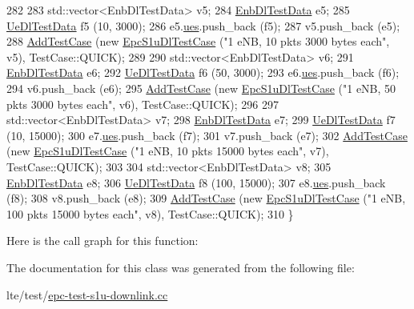 \begin{DoxyCode}
282 
283   std::vector<EnbDlTestData> v5;  
284   \hyperlink{structEnbDlTestData}{EnbDlTestData} e5;
285   \hyperlink{structUeDlTestData}{UeDlTestData} f5 (10, 3000);
286   e5.\hyperlink{structEnbDlTestData_a919da2f180c68423fc47ba8e1b088b13}{ues}.push\_back (f5);
287   v5.push\_back (e5);
288   \hyperlink{classns3_1_1TestCase_a3718088e3eefd5d6454569d2e0ddd835}{AddTestCase} (\textcolor{keyword}{new} \hyperlink{classEpcS1uDlTestCase}{EpcS1uDlTestCase} (\textcolor{stringliteral}{"1 eNB, 10 pkts 3000 bytes each"}, v5), 
      TestCase::QUICK);
289 
290   std::vector<EnbDlTestData> v6;  
291   \hyperlink{structEnbDlTestData}{EnbDlTestData} e6;
292   \hyperlink{structUeDlTestData}{UeDlTestData} f6 (50, 3000);
293   e6.\hyperlink{structEnbDlTestData_a919da2f180c68423fc47ba8e1b088b13}{ues}.push\_back (f6);
294   v6.push\_back (e6);
295   \hyperlink{classns3_1_1TestCase_a3718088e3eefd5d6454569d2e0ddd835}{AddTestCase} (\textcolor{keyword}{new} \hyperlink{classEpcS1uDlTestCase}{EpcS1uDlTestCase} (\textcolor{stringliteral}{"1 eNB, 50 pkts 3000 bytes each"}, v6), 
      TestCase::QUICK);
296   
297   std::vector<EnbDlTestData> v7;  
298   \hyperlink{structEnbDlTestData}{EnbDlTestData} e7;
299   \hyperlink{structUeDlTestData}{UeDlTestData} f7 (10, 15000);
300   e7.\hyperlink{structEnbDlTestData_a919da2f180c68423fc47ba8e1b088b13}{ues}.push\_back (f7);
301   v7.push\_back (e7);
302   \hyperlink{classns3_1_1TestCase_a3718088e3eefd5d6454569d2e0ddd835}{AddTestCase} (\textcolor{keyword}{new} \hyperlink{classEpcS1uDlTestCase}{EpcS1uDlTestCase} (\textcolor{stringliteral}{"1 eNB, 10 pkts 15000 bytes each"}, v7), 
      TestCase::QUICK);
303 
304   std::vector<EnbDlTestData> v8;  
305   \hyperlink{structEnbDlTestData}{EnbDlTestData} e8;
306   \hyperlink{structUeDlTestData}{UeDlTestData} f8 (100, 15000);
307   e8.\hyperlink{structEnbDlTestData_a919da2f180c68423fc47ba8e1b088b13}{ues}.push\_back (f8);
308   v8.push\_back (e8);
309   \hyperlink{classns3_1_1TestCase_a3718088e3eefd5d6454569d2e0ddd835}{AddTestCase} (\textcolor{keyword}{new} \hyperlink{classEpcS1uDlTestCase}{EpcS1uDlTestCase} (\textcolor{stringliteral}{"1 eNB, 100 pkts 15000 bytes each"}, v8), 
      TestCase::QUICK);
310 \}
\end{DoxyCode}


Here is the call graph for this function\+:




The documentation for this class was generated from the following file\+:\begin{DoxyCompactItemize}
\item 
lte/test/\hyperlink{epc-test-s1u-downlink_8cc}{epc-\/test-\/s1u-\/downlink.\+cc}\end{DoxyCompactItemize}
